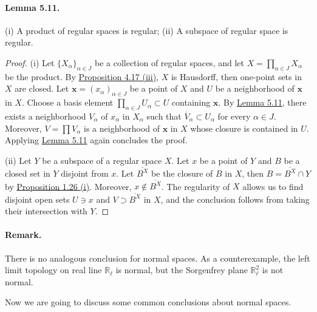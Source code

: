 \documentclass{article}
\numberwithin{equation}{section}
\theoremstyle{plain}
\theoremstyle{definition}
\begin{document}
\paragraph{Lemma 5.11.\label{lemma:5.11}} (i) A product of regular spaces is regular; (ii) A subspace of regular space is regular.
\begin{proof}
(i) Let $\{X_\alpha\}_{\alpha\in J}$ be a collection of regular spaces, and let $X=\prod_{\alpha\in J}X_\alpha$ be the product. By \hyperref[prop:4.17]{Proposition 4.17 (iii)}, $X$ is Hausdorff, then one-point sets in $X$ are closed. Let $\mathbf{x}=(x_\alpha)_{\alpha\in J}$ be a point of $X$ and $U$ be a neighborhood of $\mathbf{x}$ in $X$. Choose a basis element $\prod_{\alpha\in J}U_\alpha\subset U$ containing $\mathbf{x}$. By \hyperref[lemma:5.11]{Lemma 5.11}, there exists a neighborhood $V_\alpha$ of $x_\alpha$ in $X_\alpha$ such that $\overline{V}_\alpha\subset U_\alpha$ for every $\alpha\in J$. Moreover, $V=\prod{V}_\alpha$ is a neighborhood of $\mathbf{x}$ in $X$ whose closure is contained in $U$. Applying \hyperref[lemma:5.11]{Lemma 5.11} again concludes the proof.

(ii) Let $Y$ be a subspace of a regular space $X$. Let $x$ be a point of $Y$ and $B$ be a closed set in $Y$ disjoint from $x$. Let $\overline{B^X}$ be the closure of $B$ in $X$, then $B=\overline{B^X}\cap Y$ by \hyperref[prop:1.26]{Proposition 1.26 (i)}. Moreover, $x\notin \overline{B^X}$. The regularity of $X$ allows us to find disjoint open sets $U\ni x$ and $V\supset\overline{B^X}$ in $X$, and the conclusion follows from taking their intersection with $Y$.
\end{proof}

\paragraph{Remark.} There is no analogous conclusion for normal spaces. As a counterexample, the left limit topology on real line $\mathbb{R}_\ell$ is normal, but the Sorgenfrey plane $\mathbb{R}_\ell^2$ is not normal.

Now we are going to discuss some common conclusions about normal spaces.
\end{document}
